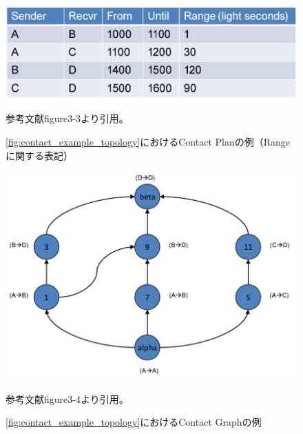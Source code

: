 \begin{figure}[tbh]
    \centering
    \includegraphics[width=0.5\textheight]{img/contact_example_contactrange.pdf}
    \caption{\ref{fig:contact_example_topology}におけるContact Planの例（Rangeに関する表記）}
    \label{fig:contact_example_contactrange}
    \begin{minipage}{\textwidth}
        \centering
        参考文献\cite{schedule_aware_bundle_routing}figure3-3より引用。
    \end{minipage}
\end{figure}
\begin{figure}[tbh]
    \centering
    \includegraphics[width=0.5\textheight]{img/contact_example_contactgraph.pdf}
    \caption{\ref{fig:contact_example_topology}におけるContact Graphの例}
    \label{fig:contact_example_contactgraph}
    \begin{minipage}{\textwidth}
        \centering
        参考文献\cite{schedule_aware_bundle_routing}figure3-4より引用。
    \end{minipage}
\end{figure}